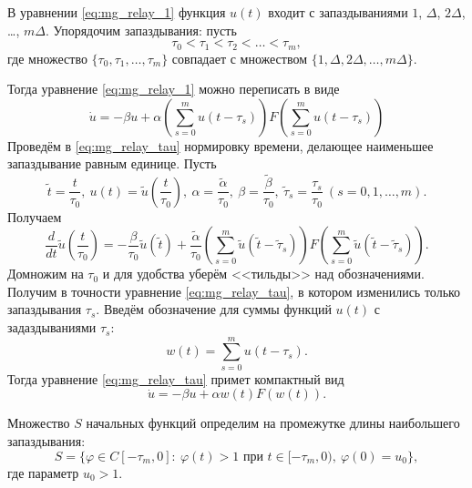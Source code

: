 В уравнении \eqref{eq:mg_relay_1} функция $u(t)$ входит с запаздываниями $1$, $\Delta$, $2\Delta$, \dots, $m\Delta$. Упорядочим запаздывания: пусть
$$\tau_0 < \tau_1 < \tau_2 < \ldots < \tau_m,$$
где множество $\{\tau_0, \tau_1, \ldots, \tau_m\}$ совпадает с множеством $\{1, \Delta, 2\Delta, \ldots, m\Delta\}$.

Тогда уравнение \eqref{eq:mg_relay_1} можно переписать в виде
\begin{equation}
	\label{eq:mg_relay_tau}
	\dot{u}=-\beta u+\alpha\left(\sum_{s=0}^{m}u(t-\tau_s)\right)F\left(\sum_{s=0}^{m}u(t-\tau_s)\right)
\end{equation}
%
Проведём в \eqref{eq:mg_relay_tau} нормировку времени, делающее наименьшее запаздывание равным единице. Пусть
%
\begin{equation*}
	\tilde{t} = \frac{t}{\tau_0}, \ u(t) = \tilde{u}\left(\frac{t}{\tau_0}\right), \ \alpha = \frac{\tilde{\alpha}}{\tau_0}, \ \beta = \frac{\tilde{\beta}}{\tau_0}, \ \tilde{\tau}_s = \frac{\tau_s}{\tau_0} \ (s = 0, 1, \ldots, m).
\end{equation*}
%
Получаем
%
\begin{equation*}
	\frac{d}{dt} \tilde{u}\left(\frac{t}{\tau_0}\right) = -\frac{\beta}{\tau_0} \tilde{u}(\tilde{t}) + \frac{\tilde{\alpha}}{\tau_0} \left(\sum_{s=0}^{m}\tilde{u}(\tilde{t}-\tilde{\tau}_s)\right) F \left(\sum_{s=0}^{m}\tilde{u}(\tilde{t}-\tilde{\tau}_s)\right).
\end{equation*}
%
Домножим на $\tau_0$ и для удобства уберём <<тильды>> над обозначениями. Получим в точности уравнение \eqref{eq:mg_relay_tau}, в котором изменились только запаздывания $\tau_s$.
%
Введём обозначение для суммы функций $u(t)$ с задаздываниями $\tau_s$:
%
\begin{equation*}
	w(t) = \sum\limits_{s = 0}^m u(t - \tau_s).
\end{equation*}
%
Тогда уравнение \eqref{eq:mg_relay_tau} примет компактный вид
%
\begin{equation}
	\label{eq:mg_relay_w}
	\dot{u}=-\beta u+\alpha w(t) F(w(t)).
\end{equation}

Множество $S$ начальных функций определим на промежутке длины наибольшего запаздывания: 
%
\begin{equation}
	\label{eq:mg_init_set}
	S = \{\varphi\in C[-\tau_{m},0]:\  \varphi(t)>1 \text{ при } t\in[-\tau_{m},0),\ \varphi(0)=u_0\},
\end{equation}
%
где параметр $u_0 > 1$.

